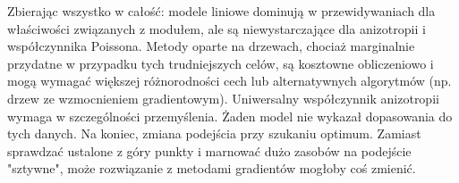 \hspace{1.5cm} Zbierając wszystko w całość: modele liniowe dominują w przewidywaniach dla właściwości związanych z modułem, ale są niewystarczające dla anizotropii i współczynnika Poissona. Metody oparte na drzewach, chociaż marginalnie przydatne w przypadku tych trudniejszych celów, są kosztowne obliczeniowo i mogą wymagać większej różnorodności cech lub alternatywnych algorytmów (np. drzew ze wzmocnieniem gradientowym). Uniwersalny współczynnik anizotropii wymaga w szczególności przemyślenia. Żaden model nie wykazał dopasowania do tych danych. Na koniec, zmiana podejścia przy szukaniu optimum. Zamiast sprawdzać ustalone z góry punkty i marnować dużo zasobów na podejście "sztywne", może rozwiązanie z metodami gradientów mogłoby coś zmienić.